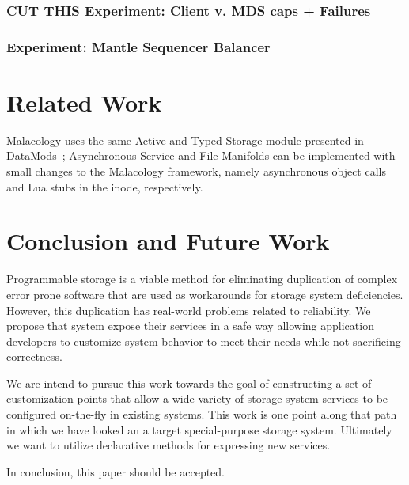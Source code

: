 \documentclass[10pt,twocolumn]{article}
\begin{document}
\subsubsection{CUT THIS Experiment: Client v. MDS caps +
Failures}\label{cut-this-experiment-client-v.-mds-caps-failures}

\subsubsection{Experiment: Mantle Sequencer
Balancer}\label{experiment-mantle-sequencer-balancer}

\section{Related Work}

Malacology uses the same Active and Typed Storage module presented in
DataMods~\cite{watkins_datamods_2012}; Asynchronous Service and File
Manifolds can be implemented with small changes to the Malacology
framework, namely asynchronous object calls and Lua stubs in the inode,
respectively.


\section{Conclusion and Future Work}\label{conclusion-and-future-work}

Programmable storage is a viable method for eliminating duplication of
complex error prone software that are used as workarounds for storage
system deficiencies. However, this duplication has real-world problems
related to reliability. We propose that system expose their services in
a safe way allowing application developers to customize system behavior
to meet their needs while not sacrificing correctness.

We are intend to pursue this work towards the goal of constructing a set
of customization points that allow a wide variety of storage system
services to be configured on-the-fly in existing systems. This work is
one point along that path in which we have looked an a target
special-purpose storage system. Ultimately we want to utilize
declarative methods for expressing new services.

In conclusion, this paper should be accepted.



\end{document}
